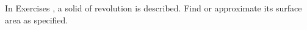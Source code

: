 {\noindent In Exercises}
{, a solid of revolution is described. Find or approximate its surface area as specified. 
}
